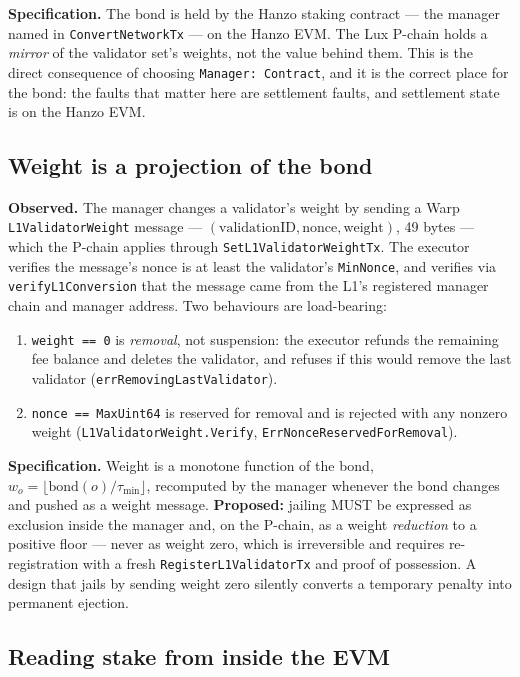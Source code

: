 \documentclass[11pt,a4paper]{article}
\theoremstyle{definition}
\theoremstyle{remark}
\newcommand{\code}[1]{\texttt{#1}}
\begin{document}
\textbf{Specification.} The bond is held by the Hanzo staking contract --- the
manager named in \code{ConvertNetworkTx} --- on the Hanzo EVM. The Lux P-chain
holds a \emph{mirror} of the validator set's weights, not the value behind them.
This is the direct consequence of choosing \code{Manager: Contract}, and it is
the correct place for the bond: the faults that matter here are settlement
faults, and settlement state is on the Hanzo EVM.

\subsection{Weight is a projection of the bond}

\textbf{Observed.} The manager changes a validator's weight by sending a Warp
\code{L1ValidatorWeight} message --- $(\text{validationID}, \text{nonce},
\text{weight})$, 49 bytes --- which the P-chain applies through
\code{SetL1ValidatorWeightTx}. The executor verifies the message's nonce is at
least the validator's \code{MinNonce}, and verifies via \code{verifyL1Conversion}
that the message came from the L1's registered manager chain and manager
address. Two behaviours are load-bearing:

\begin{enumerate}[leftmargin=2.2em]
\item \code{weight == 0} is \emph{removal}, not suspension: the executor
refunds the remaining fee balance and deletes the validator, and refuses if this
would remove the last validator (\code{errRemovingLastValidator}).
\item \code{nonce == MaxUint64} is reserved for removal and is rejected with any
nonzero weight (\code{L1ValidatorWeight.Verify}, \code{ErrNonceReservedForRemoval}).
\end{enumerate}

\textbf{Specification.} Weight is a monotone function of the bond,
$w_o = \lfloor \mathrm{bond}(o) / \tau_{\min} \rfloor$, recomputed by the manager
whenever the bond changes and pushed as a weight message. \textbf{Proposed:}
jailing MUST be expressed as exclusion inside the manager and, on the P-chain,
as a weight \emph{reduction} to a positive floor --- never as weight zero, which
is irreversible and requires re-registration with a fresh
\code{RegisterL1ValidatorTx} and proof of possession. A design that jails by
sending weight zero silently converts a temporary penalty into permanent
ejection.

\subsection{Reading stake from inside the EVM}
\end{document}
